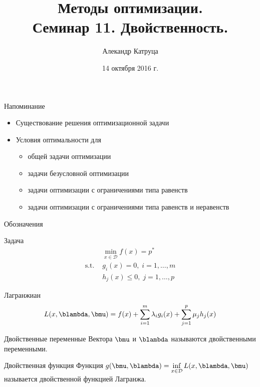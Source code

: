 \documentclass[12pt,russian]{beamer}
\title[Семинар 11]{Методы оптимизации. \\
 Семинар 11. Двойственность.}
\author{Алекандр Катруца}
\institute{Московский физико-технический институт,\\
Факультет Управления и Прикладной Математики}
\date{14 октября 2016 г.}
\begin{document}
\begin{frame}
\maketitle
\end{frame}

\begin{frame}{Напоминание}
\begin{itemize}
\item Существование решения оптимизационной задачи 
\item Условия оптимальности для
\begin{itemize}
\item общей задачи оптимизации
\item задачи безусловной оптимизации
\item задачи оптимизации с ограничениями типа равенств
\item задачи оптимизации с ограничениями типа равенств и неравенств
\end{itemize}
\end{itemize}
\end{frame}

\begin{frame}{Обозначения}
\small
\begin{block}{Задача}
\vspace{-5mm}
\begin{equation*}
\begin{split}
& \min\limits_{x \in \mathcal{D}} f(x) = p^*\\
\text{s.t. } & g_i(x) = 0, \; i = 1,\ldots,m\\
& h_j(x) \leq 0, \; j = 1,\ldots, p
\end{split}
\end{equation*}
\end{block}

\begin{block}{Лагранжиан}
\vspace{-2mm}
\begin{equation*}
L(x, \blambda, \bmu) = f(x) + \sum\limits_{i=1}^m\lambda_i g_i(x) + \sum\limits_{j=1}^p \mu_j h_j(x)
\vspace{-2mm}
\end{equation*}
\end{block}

\begin{block}{Двойственные переменные}
Вектора $\bmu$ и $\blambda$ называются двойственными переменными.
\end{block}

\begin{block}{Двойственная функция}
Функция $g(\bmu, \blambda) = \inf\limits_{x\in \mathcal{D}} L(x, \blambda, \bmu)$ называется двойственной функцией Лагранжа.
\end{block}

\end{frame}
\end{document}
